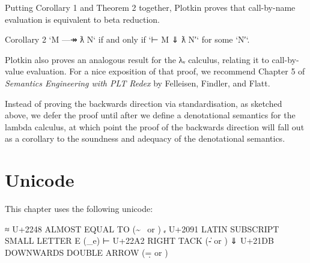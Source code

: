 Putting Corollary 1 and Theorem 2 together, Plotkin proves that
call-by-name evaluation is equivalent to beta reduction.

\begin{myDisplay}
Corollary 2
`M —↠ ƛ N` if and only if `⊢ M ⇓ ƛ N′` for some `N′`.
\end{myDisplay}

Plotkin also proves an analogous result for the λᵥ calculus, relating it
to call-by-value evaluation. For a nice exposition of that proof, we
recommend Chapter 5 of \emph{Semantics Engineering with PLT Redex} by
Felleisen, Findler, and Flatt.

Instead of proving the backwards direction via standardisation, as
sketched above, we defer the proof until after we define a denotational
semantics for the lambda calculus, at which point the proof of the
backwards direction will fall out as a corollary to the soundness and
adequacy of the denotational semantics.

\hypertarget{unicode}{%
\section{Unicode}\label{unicode}}

This chapter uses the following unicode:

\begin{myDisplay}
≈  U+2248  ALMOST EQUAL TO (\~~ or \approx)
ₑ  U+2091  LATIN SUBSCRIPT SMALL LETTER E (\_e)
⊢  U+22A2  RIGHT TACK (\|- or \vdash)
⇓  U+21DB  DOWNWARDS DOUBLE ARROW (\d= or \Downarrow)
\end{myDisplay}

